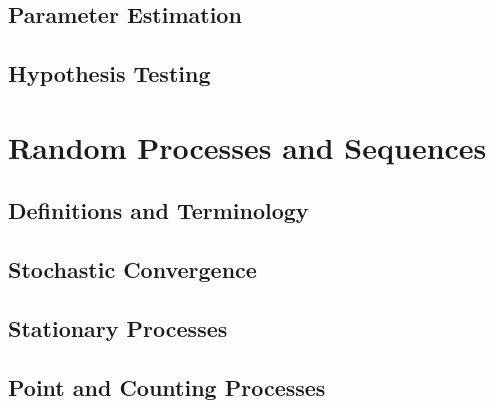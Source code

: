 \documentclass{amro-notes}
\begin{document}
\chapter{Parameter Estimation}


\chapter{Hypothesis Testing}


\part{Random Processes and Sequences}
\chapter{Definitions and Terminology}


\chapter{Stochastic Convergence}


\chapter{Stationary Processes}


\chapter{Point and Counting Processes}


\begin{appendices}
    
\end{appendices}





\printindex
\end{document}
